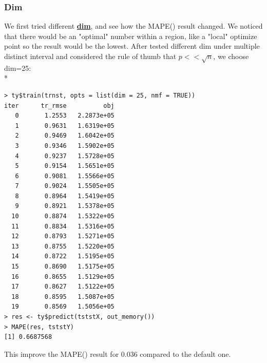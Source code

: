 \documentclass[11pt]{article}
\newcommand\tab[1][0.5cm]{\hspace*{#1}}
\begin{document}
\subsubsection{Dim}
\tab{}We first tried different \textbf{\underline{dim}}, and see how the MAPE() result changed. We noticed that there would be an "optimal" number within a region, like a "local" optimize point so the result would be the lowest. After tested different dim under multiple distinct interval and considered the rule of thumb that $p << \sqrt{n}$, we choose dim=25:
\\*
\begin{verbatim}
> ty$train(trnst, opts = list(dim = 25, nmf = TRUE))
iter      tr_rmse          obj
   0       1.2553   2.2873e+05
   1       0.9631   1.6319e+05
   2       0.9469   1.6042e+05
   3       0.9346   1.5902e+05
   4       0.9237   1.5728e+05
   5       0.9154   1.5651e+05
   6       0.9081   1.5566e+05
   7       0.9024   1.5505e+05
   8       0.8964   1.5419e+05
   9       0.8921   1.5378e+05
  10       0.8874   1.5322e+05
  11       0.8834   1.5316e+05
  12       0.8793   1.5271e+05
  13       0.8755   1.5220e+05
  14       0.8722   1.5195e+05
  15       0.8690   1.5175e+05
  16       0.8655   1.5129e+05
  17       0.8627   1.5122e+05
  18       0.8595   1.5087e+05
  19       0.8569   1.5056e+05
> res <- ty$predict(tststX, out_memory())
> MAPE(res, tststY)
[1] 0.6687568
\end{verbatim}
This improve the MAPE() result for 0.036 compared to the default one.
\end{document}

